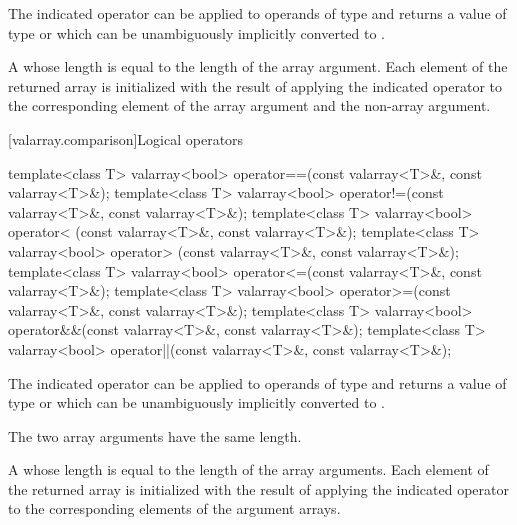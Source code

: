\begin{itemdescr}
\pnum
\mandates
The indicated operator can be applied to operands of type  and returns
a value of type  or which can be unambiguously
implicitly converted to .

\pnum
\returns
A  whose length is equal to the
length of the array argument.
Each element of the returned array is
initialized with the result of applying the indicated operator to the
corresponding element of the array argument and the non-array argument.
\end{itemdescr}

[valarray.comparison]{Logical operators}

%
%
%
%
%
%
%
%
\begin{itemdecl}
template<class T> valarray<bool> operator==(const valarray<T>&, const valarray<T>&);
template<class T> valarray<bool> operator!=(const valarray<T>&, const valarray<T>&);
template<class T> valarray<bool> operator< (const valarray<T>&, const valarray<T>&);
template<class T> valarray<bool> operator> (const valarray<T>&, const valarray<T>&);
template<class T> valarray<bool> operator<=(const valarray<T>&, const valarray<T>&);
template<class T> valarray<bool> operator>=(const valarray<T>&, const valarray<T>&);
template<class T> valarray<bool> operator&&(const valarray<T>&, const valarray<T>&);
template<class T> valarray<bool> operator||(const valarray<T>&, const valarray<T>&);
\end{itemdecl}

\begin{itemdescr}
\pnum
\mandates
The indicated operator can be applied to operands of type  and returns
a value of type  or which can be unambiguously
implicitly converted to .

\pnum
\expects
The two array arguments have the same length.

\pnum
\returns
A  whose length
is equal to the length of the array arguments.
Each element of the returned
array is initialized with the result of applying the indicated
operator to the corresponding elements of the argument arrays.
\end{itemdescr}

